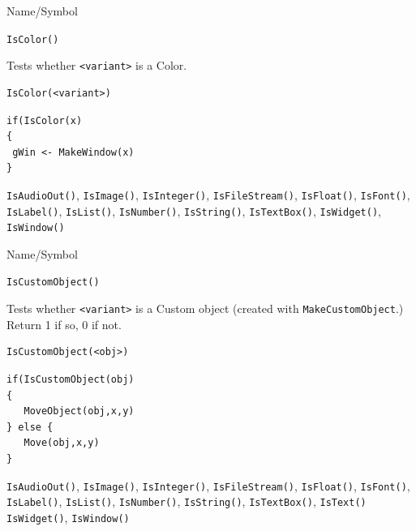 \begin{desc}{Name/Symbol}
\item[Name/Symbol]	\verb+IsColor()+

\item[Description]	Tests whether \verb+<variant>+ is a Color.

\item[Usage]
\begin{verbatim}
IsColor(<variant>)
\end{verbatim}

\item[Example]
\begin{verbatim}
if(IsColor(x)
{
 gWin <- MakeWindow(x)
}
\end{verbatim}

\item[See Also] \verb+IsAudioOut()+, \verb+IsImage()+,
  \verb+IsInteger()+, \verb+IsFileStream()+, \verb+IsFloat()+,
  \verb+IsFont()+, \verb+IsLabel()+, \verb+IsList()+,
  \verb+IsNumber()+, \verb+IsString()+, \verb+IsTextBox()+,
  \verb+IsWidget()+, \verb+IsWindow()+
\end{desc}

\begin{desc}{Name/Symbol}
\item[Name/Symbol]	\verb+IsCustomObject()+

\item[Description]	Tests whether \verb+<variant>+ is a Custom object (created with \verb+MakeCustomObject+.) Return 1 if so, 0 if not.

\item[Usage]
\begin{verbatim}
IsCustomObject(<obj>)
\end{verbatim}

\item[Example]
\begin{verbatim}
if(IsCustomObject(obj)
{
   MoveObject(obj,x,y)
} else {
   Move(obj,x,y)
}
\end{verbatim}

\item[See Also] \verb+IsAudioOut()+, \verb+IsImage()+,
  \verb+IsInteger()+, \verb+IsFileStream()+, \verb+IsFloat()+,
  \verb+IsFont()+, \verb+IsLabel()+, \verb+IsList()+,
  \verb+IsNumber()+, \verb+IsString()+, \verb+IsTextBox()+, \verb+IsText()+
  \verb+IsWidget()+, \verb+IsWindow()+
\end{desc}



